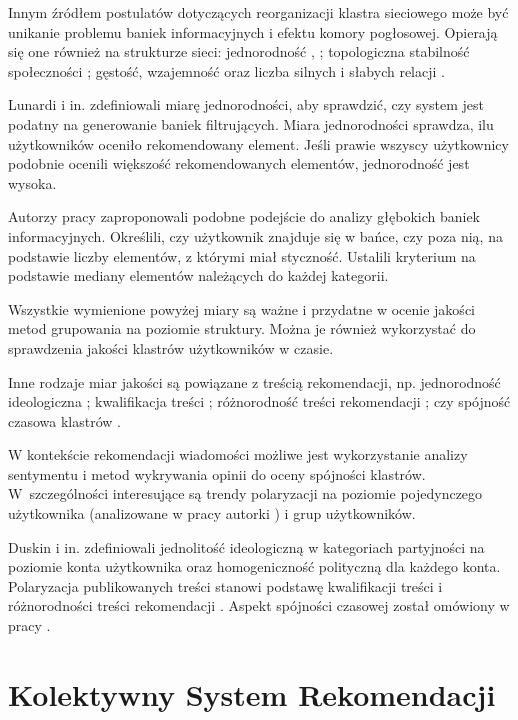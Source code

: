 Innym źródłem postulatów dotyczących reorganizacji klastra sieciowego może być unikanie problemu baniek informacyjnych i efektu komory pogłosowej. Opierają się one również na strukturze sieci: jednorodność \cite{lunardi}, \cite{sukiennik}; topologiczna stabilność społeczności \cite{kong}; gęstość, wzajemność oraz liczba silnych i słabych relacji \cite{duskin}.

Lunardi i in. \cite{lunardi} zdefiniowali miarę jednorodności, aby sprawdzić, czy system jest podatny na generowanie baniek filtrujących. Miara jednorodności sprawdza, ilu użytkowników oceniło rekomendowany element. Jeśli prawie wszyscy użytkownicy podobnie ocenili większość rekomendowanych elementów, jednorodność jest wysoka.

Autorzy pracy \cite{sukiennik} zaproponowali podobne podejście do analizy głębokich baniek informacyjnych. Określili, czy użytkownik znajduje się w bańce, czy poza nią, na podstawie liczby elementów, z którymi miał styczność. Ustalili kryterium na podstawie mediany elementów należących do każdej kategorii.

Wszystkie wymienione powyżej miary są ważne i przydatne w ocenie jakości metod grupowania na poziomie struktury. Można je również wykorzystać do sprawdzenia jakości klastrów użytkowników w czasie.

Inne rodzaje miar jakości są powiązane z treścią rekomendacji, np. jednorodność ideologiczna \cite{duskin}; kwalifikacja treści \cite{interian}; różnorodność treści rekomendacji \cite{nguyen}; czy spójność czasowa klastrów \cite{kong}.

W kontekście rekomendacji wiadomości możliwe jest wykorzystanie analizy sentymentu i metod wykrywania opinii do oceny spójności klastrów. W~szczególności interesujące są trendy polaryzacji na poziomie pojedynczego użytkownika (analizowane w pracy autorki \cite{maleszka1}) i grup użytkowników.

Duskin i in. \cite{duskin} zdefiniowali jednolitość ideologiczną w kategoriach partyjności na poziomie konta użytkownika oraz homogeniczność polityczną dla każdego konta. Polaryzacja publikowanych treści stanowi podstawę kwalifikacji treści \cite{interian} i różnorodności treści rekomendacji \cite{nguyen}. Aspekt spójności czasowej został omówiony w pracy \cite{kong}. 


\section{Kolektywny System Rekomendacji}\label{system}

